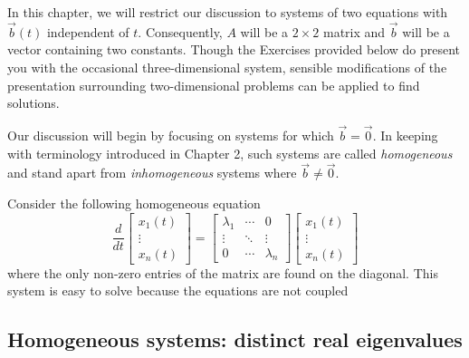 \documentclass[../book.tex]{subfiles}
\begin{document}
In this chapter, we will restrict our discussion to systems of two equations with \(\vec{b}(t)\) independent of \(t\). Consequently, \(A\) will be a \(2\times 2\) matrix and \(\vec{b}\) will be a vector containing two constants. Though the Exercises provided below do present you with the occasional three-dimensional system, sensible modifications of the presentation surrounding two-dimensional problems can be applied to find solutions.

Our discussion will begin by focusing on systems for which \(\vec{b} = \vec{0}\). In keeping with terminology introduced in Chapter 2, such systems are called \emph{homogeneous} and stand apart from \emph{inhomogeneous} systems where \(\vec{b}\neq \vec{0}\).

Consider the following homogeneous equation
\begin{equation}\label{eq:sys-8}
\frac{d}{dt}
\begin{bmatrix}
  x_1(t) \\ \vdots \\ x_n(t)
\end{bmatrix}	 
= 
\begin{bmatrix}
  \lambda_1 &\cdots& 0 \\
  \vdots & \ddots & \vdots \\
  0&\cdots& \lambda_n
\end{bmatrix}
\begin{bmatrix}
  x_1(t) \\ \vdots \\ x_n(t)
\end{bmatrix}	 
\end{equation}
where the only non-zero entries of the matrix are found on the diagonal. This system is easy to solve because the equations are not coupled

\subsection{Homogeneous systems: distinct real eigenvalues}
\end{document}
